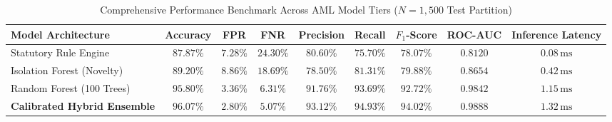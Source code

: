 \documentclass[journal]{IEEEtran}
\begin{document}
\begin{table}[!t]
\caption{Comprehensive Performance Benchmark Across AML Model Tiers ($N=1,500$ Test Partition)}
\label{tab:benchmark}
\centering
\begin{tabular}{lcccccccc}
\toprule
\textbf{Model Architecture} & \textbf{Accuracy} & \textbf{FPR} & \textbf{FNR} & \textbf{Precision} & \textbf{Recall} & \textbf{$F_1$-Score} & \textbf{ROC-AUC} & \textbf{Inference Latency} \\
\midrule
Statutory Rule Engine & $87.87\%$ & $7.28\%$ & $24.30\%$ & $80.60\%$ & $75.70\%$ & $78.07\%$ & $0.8120$ & $0.08\,\mathrm{ms}$ \\
Isolation Forest (Novelty) & $89.20\%$ & $8.86\%$ & $18.69\%$ & $78.50\%$ & $81.31\%$ & $79.88\%$ & $0.8654$ & $0.42\,\mathrm{ms}$ \\
Random Forest (100 Trees) & $95.80\%$ & $3.36\%$ & $6.31\%$ & $91.76\%$ & $93.69\%$ & $92.72\%$ & $0.9842$ & $1.15\,\mathrm{ms}$ \\
\textbf{Calibrated Hybrid Ensemble} & $\mathbf{96.07\%}$ & $\mathbf{2.80\%}$ & $\mathbf{5.07\%}$ & $\mathbf{93.12\%}$ & $\mathbf{94.93\%}$ & $\mathbf{94.02\%}$ & $\mathbf{0.9888}$ & $\mathbf{1.32\,\mathrm{ms}}$ \\
\bottomrule
\end{tabular}
\end{table}
\end{document}

